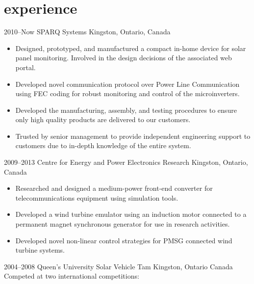 
\section{experience}

\begin{entrylist}
\entry
  {2010--Now}
  {SPARQ Systems}
  {Kingston, Ontario, Canada}
  {
\begin{itemize}
\item Designed, prototyped, and manufactured a compact in-home device for solar panel monitoring. Involved in the design decisions of the associated web portal.
\item Developed novel communication protocol over Power Line Communication using FEC coding for robust monitoring and control of the microinverters.
\item Developed the manufacturing, assembly, and testing procedures to ensure only high quality products are delivered to our customers.
\item Trusted by senior management to provide independent engineering support to customers due to in-depth knowledge of the entire system.
\end{itemize}
}
\entry
  {2009--2013}
  {Centre for Energy and Power Electronics Research}
  {Kingston, Ontario, Canada}
  {
  \begin{itemize}
    \item Researched and designed a medium-power front-end converter for telecommunications equipment using simulation tools. 
    \item Developed a wind turbine emulator using an induction motor connected to a permanent magnet synchronous generator for use in research activities.
    \item Developed novel non-linear control strategies for PMSG connected wind turbine systems.
  \end{itemize}}
\entry
  {2004--2008}
  {Queen's University Solar Vehicle Tam}
  {Kingston, Ontario Canada}
  {\\
  Competed at two international competitions:
}
\end{entrylist}
